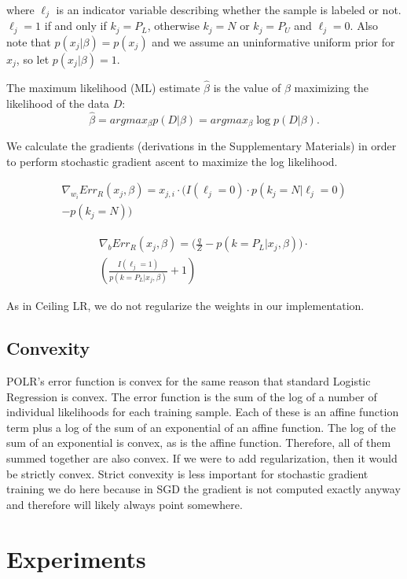 \documentclass{article}
\begin{document}
where $\ell_j$ is an indicator variable describing whether the sample is labeled or not. $\ell_j = 1$ if and only if $k_j=P_L$, otherwise $k_j = N$ or $k_j=P_U$ and $\ell_j = 0$.  Also note that $p(x_j|\beta) = p(x_j)$ and we assume an uninformative uniform prior for $x_j$, so let $p(x_j|\beta) = 1$.

The maximum likelihood (ML) estimate $\hat \beta$ is the value of $\beta$ maximizing the likelihood of the data $D$:
$$
\hat \beta = arg max_{\beta} p(D | \beta) = arg max_{\beta} \log{p(D | \beta)}.
$$

We calculate the gradients (derivations in the Supplementary Materials) in order to perform stochastic gradient ascent to maximize the log likelihood.

\begin{eqnarray*}
\nabla_{w_i}{Err_R (x_j, \beta)} = x_{j,i} \cdot
    \big(	I(\ell_j=0) \cdot p(k_j=N | \ell_j=0) \\
		- p(k_j=N)
    \big)
\end{eqnarray*}

\begin{eqnarray*}
\nabla_{b}{Err_R (x_j, \beta)}  = \Big( \frac{q}{Z} - p(k=P_L | x_j,\beta) \Big) \cdot \\
	\left( 
		\frac{I(\ell_j=1)}{p(k=P_L | x_j,\beta)} + 1 
	  \right)
\end{eqnarray*}

As in Ceiling LR, we do not regularize the weights in our implementation.

\subsection{Convexity}

POLR's error function is convex for the same reason that standard Logistic Regression is convex. The error function is the sum of the log of a number of individual likelihoods for each training sample. Each of these is an affine function term plus a log of the sum of an exponential of an affine function. The log of the sum of an exponential is convex, as is the affine function.  Therefore, all of them summed together are also convex.  If we were to add regularization, then it would be strictly convex.  Strict convexity is less important for stochastic gradient training we do here because in SGD the gradient is not computed exactly anyway and therefore will likely always point somewhere.

\section{Experiments}
\end{document}

